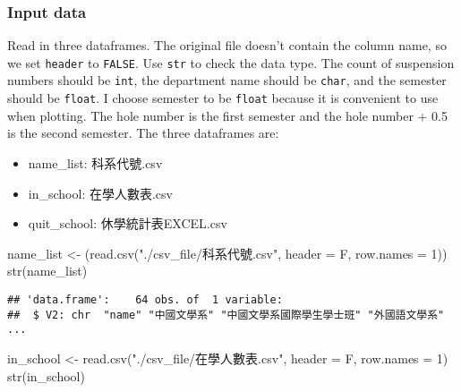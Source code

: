 \documentclass[
]{article}
\newenvironment{Shaded}{\begin{snugshade}}{\end{snugshade}}
\newcommand{\AttributeTok}[1]{\textcolor[rgb]{0.77,0.63,0.00}{#1}}
\newcommand{\DecValTok}[1]{\textcolor[rgb]{0.00,0.00,0.81}{#1}}
\newcommand{\FunctionTok}[1]{\textcolor[rgb]{0.00,0.00,0.00}{#1}}
\newcommand{\NormalTok}[1]{#1}
\newcommand{\OtherTok}[1]{\textcolor[rgb]{0.56,0.35,0.01}{#1}}
\newcommand{\StringTok}[1]{\textcolor[rgb]{0.31,0.60,0.02}{#1}}
\providecommand{\tightlist}{%
  \setlength{\itemsep}{0pt}\setlength{\parskip}{0pt}}
\begin{document}
\hypertarget{input-data}{%
\subsubsection{Input data}\label{input-data}}

Read in three dataframes. The original file doesn't contain the column
name, so we set \texttt{header} to \texttt{FALSE}. Use \texttt{str} to
check the data type. The count of suspension numbers should be
\texttt{int}, the department name should be \texttt{char}, and the
semester should be \texttt{float}. I choose semester to be
\texttt{float} because it is convenient to use when plotting. The hole
number is the first semester and the hole number + 0.5 is the second
semester. The three dataframes are:

\begin{itemize}
\tightlist
\item
  name\_list: 科系代號.csv\\
\item
  in\_school: 在學人數表.csv\\
\item
  quit\_school: 休學統計表EXCEL.csv
\end{itemize}

\begin{Shaded}
\begin{Highlighting}[]
\NormalTok{name\_list }\OtherTok{\textless{}{-}}\NormalTok{  (}\FunctionTok{read.csv}\NormalTok{(}\StringTok{"./csv\_file/科系代號.csv"}\NormalTok{, }\AttributeTok{header =}\NormalTok{ F, }\AttributeTok{row.names =} \DecValTok{1}\NormalTok{))}
\FunctionTok{str}\NormalTok{(name\_list)}
\end{Highlighting}
\end{Shaded}

\begin{verbatim}
## 'data.frame':    64 obs. of  1 variable:
##  $ V2: chr  "name" "中國文學系" "中國文學系國際學生學士班" "外國語文學系" ...
\end{verbatim}

\begin{Shaded}
\begin{Highlighting}[]
\NormalTok{in\_school }\OtherTok{\textless{}{-}} \FunctionTok{read.csv}\NormalTok{(}\StringTok{"./csv\_file/在學人數表.csv"}\NormalTok{, }\AttributeTok{header =}\NormalTok{ F, }\AttributeTok{row.names =} \DecValTok{1}\NormalTok{)}
\FunctionTok{str}\NormalTok{(in\_school)}
\end{Highlighting}
\end{Shaded}
\end{document}
